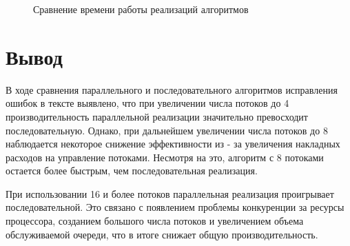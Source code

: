 \begin{figure}[ht!]
	\begin{center}
		\captionsetup{singlelinecheck = false, justification=centerfirst}
		\centering
		\caption{Сравнение времени работы реализаций алгоритмов}
		\label{fig:graph1}
	\end{center}
\end{figure}
\clearpage

\section*{Вывод}

В ходе сравнения параллельного и последовательного алгоритмов исправления ошибок в тексте выявлено, что при увеличении числа потоков до 4 производительность параллельной реализации значительно превосходит последовательную. 
Однако, при дальнейшем увеличении числа потоков до 8 наблюдается некоторое снижение эффективности из - за увеличения накладных расходов на управление потоками. 
Несмотря на это, алгоритм с 8 потоками остается более быстрым, чем последовательная реализация.

При использовании 16 и более потоков параллельная реализация проигрывает последовательной. 
Это связано с появлением проблемы конкуренции за ресурсы процессора, созданием большого числа потоков и увеличением объема обслуживаемой очереди, что в итоге снижает общую производительность.